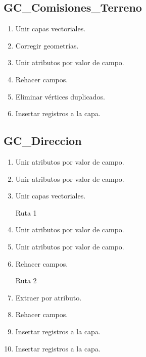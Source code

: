 \documentclass[letterpaper,10pt,spanish]{sphinxmanual}
\begin{document}
\subsection{GC\_Comisiones\_Terreno}
\label{\detokenize{ETL_SNC/Model:gc-comisiones-terreno}}\begin{enumerate}
%
\item {} 
Unir capas vectoriales.

\item {} 
Corregir geometrías.

\item {} 
Unir atributos por valor de campo.

\item {} 
Rehacer campos.

\item {} 
Eliminar vértices duplicados.

\item {} 
Insertar registros a la capa.


\end{enumerate}


\subsection{GC\_Direccion}
\label{\detokenize{ETL_SNC/Model:gc-direccion}}\begin{enumerate}
%
\item {} 
Unir atributos por valor de campo.

\item {} 
Unir atributos por valor de campo.

\item {} 
Unir capas vectoriales.

\textendash{}Ruta 1

\item {} 
Unir atributos por valor de campo.

\item {} 
Unir atributos por valor de campo.

\item {} 
Rehacer campos.

\textendash{}Ruta 2

\item {} 
Extraer por atributo.

\item {} 
Rehacer campos.

\item {} 
Insertar registros a la capa.

\item {} 
Insertar registros a la capa.


\end{enumerate}
\end{document}
